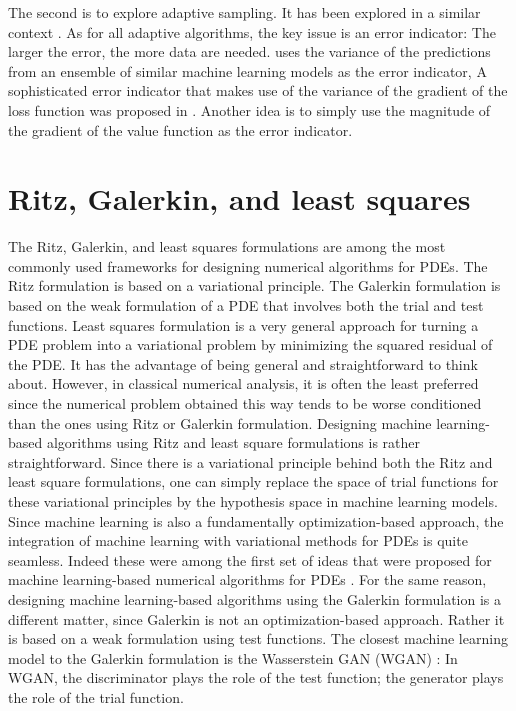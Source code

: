 \documentclass[12pt,AutoFakeBold,AutoFakeSlant]{article}
\theoremstyle{definition}
\begin{document}
	The second is to explore adaptive sampling. %
	It has been explored in a similar context  \cite{zhang2020dp}.
	As for all adaptive algorithms, the key issue is an  error indicator: The larger the error, the more data are needed.
	\cite{zhang2020dp} uses the variance of the predictions from an ensemble of similar machine learning models as the error indicator,
	A  sophisticated error indicator that makes use of the variance of the gradient of the loss function was proposed in
	\cite{nakamura2019adaptive}.   Another idea is to simply use the magnitude of the gradient of the value function as the error indicator.


	\section{Ritz,  Galerkin, and least squares}
	The Ritz, Galerkin, and least squares formulations are among the most commonly
	used frameworks for designing numerical algorithms for PDEs.
	The Ritz formulation is based on a variational principle.
	The Galerkin formulation is based on the weak formulation of a PDE that involves
	both the trial and test functions.
	Least squares formulation is a very general approach for turning a PDE problem
	into a variational problem by minimizing the squared residual of the PDE. 
	It has the advantage of being general and straightforward to think about.
	However, in classical numerical analysis, it is often the least preferred since the numerical
	problem obtained this way tends to be worse conditioned than the ones using
	Ritz or Galerkin formulation.
	Designing machine learning-based algorithms using Ritz and least square formulations is rather
	straightforward.  Since there is a variational principle behind both the Ritz and
	least square formulations, one can simply replace the space of trial functions for
	these variational principles by the hypothesis space in machine learning models.
	Since machine learning is also a fundamentally optimization-based approach, the
	integration of machine learning with variational methods for PDEs  is quite seamless.
	Indeed these were among the first set of ideas that were proposed for machine learning-based
	numerical algorithms for PDEs \cite{carleo2017solving,E2018deep,Sirignano2018dgm}.
	For the same reason, designing machine learning-based algorithms using the Galerkin formulation is a different
	matter, since Galerkin is not an optimization-based approach.  Rather it is based
	on a weak formulation using test functions. 
	The closest machine learning model to the Galerkin formulation is the Wasserstein GAN
	(WGAN)
	\cite{arjovsky2017towards,arjovsky2017wgan}: In WGAN, the discriminator plays the role of the test function;
	the generator plays the role of the trial function. 
\end{document}
